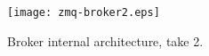 
\begin{figure}
\centering
\texttt{[image: zmq-broker2.eps]}
\caption{Broker internal architecture, take 2.}
\label{fig:cmbint2}
\end{figure}


